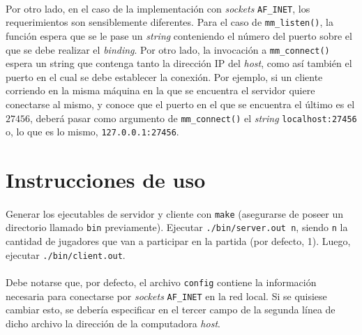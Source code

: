 \documentclass[spanish]{article}
\begin{document}
\paragraph{} Por otro lado, en el caso de la implementación con \textit{sockets} \verb|AF_INET|, los requerimientos son sensiblemente diferentes. Para el caso de \verb|mm_listen()|, la función espera que se le pase un \textit{string} conteniendo el número del puerto sobre el que se debe realizar el \textit{binding}. Por otro lado, la invocación a \verb|mm_connect()| espera un string que contenga tanto la dirección IP del \textit{host}, como así también el puerto en el cual se debe establecer la conexión. Por ejemplo, si un cliente corriendo en la misma máquina en la que se encuentra el servidor quiere conectarse al mismo, y conoce que el puerto en el que se encuentra el último es el $27456$, deberá pasar como argumento de \verb|mm_connect()| el \textit{string} \verb|localhost:27456| o, lo que es lo mismo, \verb|127.0.0.1:27456|. 
\section{Instrucciones de uso}
\paragraph{} Generar los ejecutables de servidor y cliente con \verb|make| (asegurarse de poseer un directorio llamado \verb|bin| previamente). Ejecutar \verb|./bin/server.out n|, siendo \verb|n| la cantidad de jugadores que van a participar en la partida (por defecto, 1). Luego, ejecutar \verb|./bin/client.out|. 
\paragraph{} Debe notarse que, por defecto, el archivo \verb|config| contiene la información necesaria para conectarse por \textit{sockets} \verb|AF_INET| en la red local. Si se quisiese cambiar esto, se debería especificar en el tercer campo de la segunda línea de dicho archivo la dirección de la computadora \textit{host}.
\end{document}
